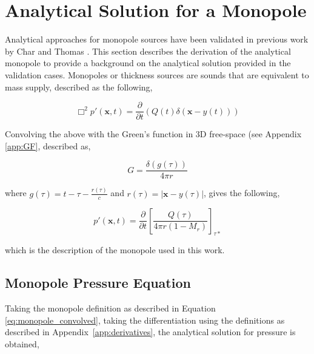 
\section{Analytical Solution for a Monopole} \label{sec:monopole_derivation}

Analytical approaches for monopole sources have been validated in previous work by Char and Thomas \cite{TingChar2024, Thomas2012}. This section describes the derivation of the analytical monopole to provide a background on the analytical solution provided in the validation cases. Monopoles or thickness sources are sounds that are equivalent to mass supply, described as the following,

\begin{equation}
    \Box^2p'(\bm{x},t) = \frac{\partial}{\partial t} (Q(t) \delta(\bm{x} - y(t)))
    \label{eq:monopole_def}
\end{equation}

Convolving the above with the Green's function in 3D free-space (see Appendix \ref{app:GF}, described as,

\begin{equation}
    G=\frac{\delta(g(\tau))}{4\pi r}
    \label{eq:GreensFunction}
\end{equation}

where $g(\tau)=t-\tau-\frac{r(\tau)}{c}$ and $r(\tau)=|\bm{x}-y(\tau)|$, gives the following,

\begin{equation}
    p'(\bm{x}, t)= \frac{\partial}{\partial t} \left[ \frac{Q(\tau)}{4\pi r (1-M_r)}\right]_{\tau*}
    \label{eq:monopole_convolved}
\end{equation}

which is the description of the monopole used in this work.


\subsection{Monopole Pressure Equation} \label{subsec:mono_p}
Taking the monopole definition as described in Equation \ref{eq:monopole_convolved}, taking the differentiation using the definitions as described in Appendix~\ref{app:derivatives}, the analytical solution for pressure is obtained,%


